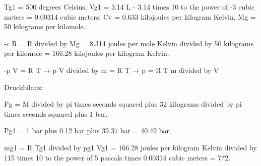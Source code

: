 Tg1 = 500 degrees Celsius, Vg1 = 3.14 L - 3.14 times 10 to the power of -3 cubic meters = 0.00314 cubic meters. Cv = 0.633 kilojoules per kilogram Kelvin, Mg = 50 kilograms per kilomole. 

-c R = R divided by Mg = 8.314 joules per mole Kelvin divided by 50 kilograms per kilomole = 166.28 kilojoules per kilogram Kelvin.

-p V = R T → p V divided by m = R T → p = R T m divided by V

Druckbilanz:

Pg = M divided by pi times seconds squared plus 32 kilograms divided by pi times seconds squared plus 1 bar.

Pg1 = 1 bar plus 0.12 bar plus 39.37 bar = 40.49 bar.

mg1 = R Tg1 divided by pg1 Vg1 = 166.28 joules per kilogram Kelvin divided by 115 times 10 to the power of 5 pascals times 0.00314 cubic meters = 772.